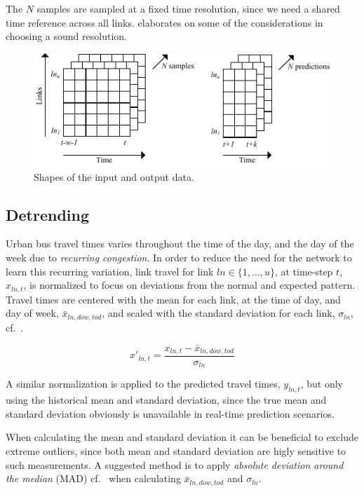 \documentclass[preprint,11pt,5p,twocolumn]{elsarticle}
\begin{document}
The $N$ samples are sampled at a fixed time resolution, since we need a shared time reference across all links.  elaborates on some of the considerations in choosing a sound resolution.

\begin{figure}[!ht]
  \centering
  \includegraphics[scale=1.1]{drawings/data_shape.pdf}
  \caption{Shapes of the input and output data.}
  \label{fig:data_shape}
\end{figure}

\subsection{Detrending}
Urban bus travel times varies throughout the time of the day, and the day of the week due to \emph{recurring congestion}. In order to reduce the need for the network to learn this recurring variation, link travel for link $\mathit{ln} \in \{ 1,\ldots,u\}$, at time-step $t$, $x_{\mathit{ln},t}$, is normalized to focus on deviations from the normal and expected pattern. Travel times are centered with the mean for each link, at the time of day, and day of week, $\mathit{\bar{x}_{\mathit{ln},\mathit{dow},\mathit{tod}}}$, and scaled with the standard deviation for each link, $\sigma_\mathit{ln}$, cf.\ .

\begin{equation}
  x'_{\mathit{ln},t} = \frac{x_{\mathit{ln},t} - \bar{x}_{\mathit{ln},\mathit{dow},\mathit{tod}}}{\sigma_\mathit{ln}}
  \label{eq:normalization}
\end{equation}

A similar normalization is applied to the predicted travel times, $y_{\mathit{ln},t}$, but only using the historical mean and standard deviation, since the true mean and standard deviation obviously is unavailable in real-time prediction scenarios.

When calculating the mean and standard deviation it can be beneficial to exclude extreme outliers, since both mean and standard deviation are higly sensitive to such measurements. A suggested method is to apply \emph{absolute deviation around the median} (MAD) cf.~\cite{Olewuezi2011} when calculating $\mathit{\bar{x}_{\mathit{ln},\mathit{dow},\mathit{tod}}}$ and $\sigma_\mathit{ln}$.
\end{document}
